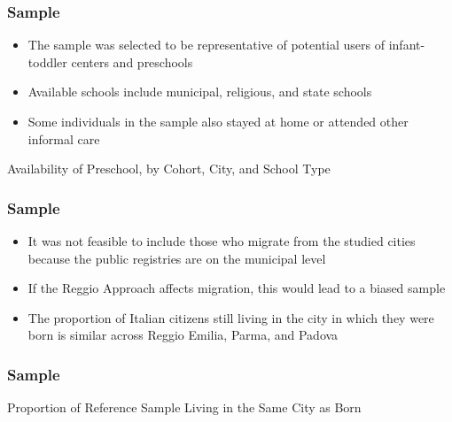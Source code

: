 \documentclass[static]{JJH-Beamer_PAGENOS}
\begin{document}
\begin{frame}
\frametitle{Sample}
\begin{itemize}
	\item The sample was selected to be representative of potential users of infant-toddler centers and preschools
	\item Available schools include municipal, religious, and state schools
	\item Some individuals in the sample also stayed at home or attended other informal care
\end{itemize}
\begin{table}[H]
\caption{Availability of Preschool, by Cohort, City, and School Type}
\end{table}
\end{frame}


\begin{frame}
\frametitle{Sample}
\begin{itemize}
	\item It was not feasible to include those who migrate from the studied cities because the public registries are on the municipal level
	\item If the Reggio Approach affects migration, this would lead to a biased sample
	\item The proportion of Italian citizens still living in the city in which they were born is similar across Reggio Emilia, Parma, and Padova
\end{itemize}
\end{frame}

\begin{frame}
\frametitle{Sample}
\begin{table}[H]
\caption{Proportion of Reference Sample Living in the Same City as Born}
\end{table}
\end{frame}

\end{document}
